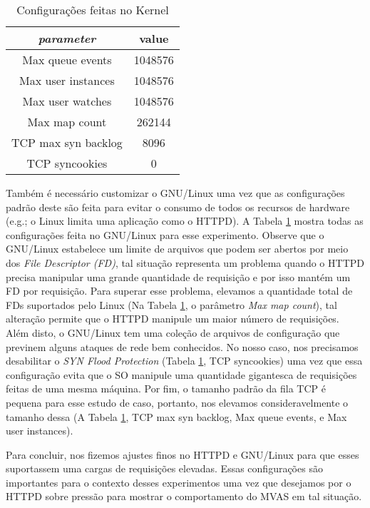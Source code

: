 \begin{table}
  \centering
  \begin{tabular}{|c|c|}
    \hline
    \textit{parameter} & \textbf{value}\\
    \hline
    Max queue events & 1048576\\
    \hline
    Max user instances & 1048576\\
    \hline
    Max user watches & 1048576\\
    \hline
    Max map count & 262144\\
    \hline
    TCP max syn backlog & 8096\\
    \hline
    TCP syncookies & 0\\
    \hline
  \end{tabular}
  \caption{Configurações feitas no Kernel}
  \label{tab:kernel_config}
\end{table}

Também é necessário customizar o GNU/Linux uma vez que as configurações padrão
deste são feita para evitar o consumo de todos os recursos de hardware (e.g.; o
Linux limita uma aplicação como o HTTPD). A Tabela \ref{tab:kernel_config}
mostra todas as configurações feita no GNU/Linux para esse experimento.
Observe que o GNU/Linux estabelece um limite de arquivos que podem ser
abertos por meio dos \emph{File Descriptor (FD)}, tal situação representa um
problema quando o HTTPD precisa manipular uma grande quantidade de requisição e
por isso mantém um FD por requisição. Para superar esse problema, elevamos a
quantidade total de FDs suportados pelo Linux (Na Tabela
\ref{tab:kernel_config}, o parâmetro \emph{Max map count}), tal alteração
permite que o HTTPD manipule um maior número de requisições. Além disto,
o GNU/Linux tem uma coleção de arquivos de configuração que previnem alguns
ataques de rede bem conhecidos. No nosso caso, nos precisamos desabilitar o
\emph{SYN Flood Protection} (Tabela \ref{tab:kernel_config}, TCP syncookies)
uma vez que essa configuração evita que o SO manipule uma quantidade gigantesca
de requisições feitas de uma mesma máquina. Por fim, o tamanho padrão da fila
TCP é pequena para esse estudo de caso, portanto, nos elevamos
consideravelmente o tamanho dessa (A Tabela \ref{tab:kernel_config}, TCP max
syn backlog, Max queue events, e Max user instances).

Para concluir, nos fizemos ajustes finos no HTTPD e GNU/Linux para que esses
suportassem uma cargas de requisições elevadas. Essas configurações são
importantes para o contexto desses experimentos uma vez que desejamos por o
HTTPD sobre pressão para mostrar o comportamento do MVAS em tal situação.


